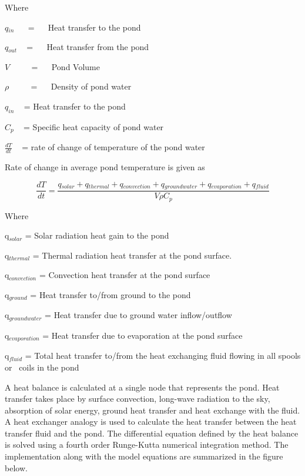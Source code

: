 Where

\(q{}_{in}\) ~~ = ~~ Heat transfer to the pond

\(q{}_{out}\) ~ = ~~ Heat transfer from the pond

\(V\) ~~~~ = ~~ Pond Volume

\(\rho\) ~~~~ = ~~ Density of pond water

\({q_{in}}\) ~ = Heat transfer to the pond

\(C{}_p\) ~ = Specific heat capacity of pond water

\(\frac{{dT}}{{dt}}\) ~ = rate of change of temperature of the pond water

Rate of change in average pond temperature is given as

\begin{equation}
\frac{{dT}}{{dt}} = \frac{{q{}_{solar} + q{}_{thermal} + q{}_{convection} + q{}_{groundwater} + q{}_{evaporation} + q{}_{fluid}}}{{V\rho C{}_p}}
\end{equation}

Where

q\(_{solar}\) = Solar radiation heat gain to the pond

q\(_{thermal}\) = Thermal radiation heat transfer at the pond surface.

q\(_{convection}\) = Convection heat transfer at the pond surface

q\(_{ground}\) = Heat transfer to/from ground to the pond

q\(_{groundwater}\) = Heat transfer due to ground water inflow/outflow

q\(_{evaporation}\) = Heat transfer due to evaporation at the pond surface

q\(_{fluid}\) = Total heat transfer to/from the heat exchanging fluid flowing in all spools or~ coils in the pond

A heat balance is calculated at a single node that represents the pond. Heat transfer takes place by surface convection, long-wave radiation to the sky, absorption of solar energy, ground heat transfer and heat exchange with the fluid. A heat exchanger analogy is used to calculate the heat transfer between the heat transfer fluid and the pond. The differential equation defined by the heat balance is solved using a fourth order Runge-Kutta numerical integration method. The implementation along with the model equations are summarized in the figure below.

